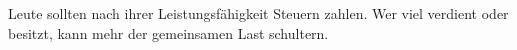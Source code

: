 Leute sollten nach ihrer Leistungsfähigkeit Steuern zahlen.
Wer viel verdient oder besitzt, kann mehr der gemeinsamen Last schultern.
